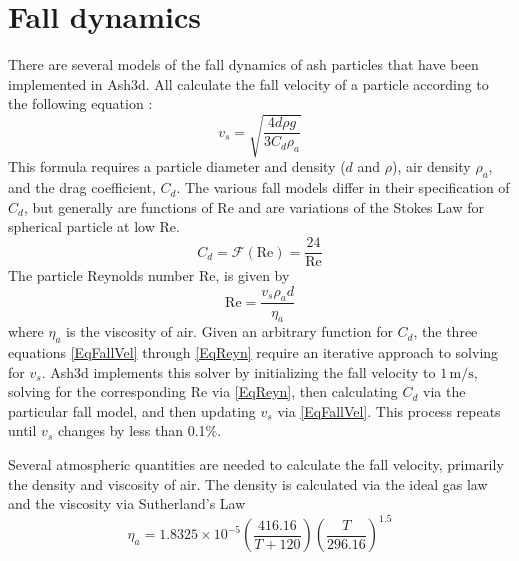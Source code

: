 \chapter{Fall dynamics}\label{ChapAppendFallDynamics}

There are several models of the fall dynamics of ash particles that have
been implemented in Ash3d.  All calculate the fall velocity of a particle
according to the following equation \cite[p.182]{Bird60}:
\begin{equation}
v_s=\sqrt{\frac{4d\rho g}{3C_d\rho_a}}\label{EqFallVel}
\end{equation}
This formula requires a particle diameter and density ($d$ and $\rho$),
air density $\rho_a$, and the drag coefficient, $C_d$.
The various fall models differ in their
specification of $C_d$, but generally are functions of $\mathrm{Re}$
and are variations of the Stokes Law
for spherical particle at low $\mathrm{Re}$.
\begin{equation}
C_d = \mathcal{F}(\mathrm{Re}) = \frac{24}{\mathrm{Re}}\label{EqCdStokes}
\end{equation}
The particle Reynolds number $\mathrm{Re}$, is given by 
\begin{equation}
\mathrm{Re}=\frac{v_s\rho_a d}{\eta_a}\label{EqReyn}
\end{equation}
where $\eta_a$ is the viscosity of air.  Given an arbitrary function
for $C_d$, the three equations \ref{EqFallVel} through \ref{EqReyn}
require an iterative approach to solving for $v_s$.  Ash3d implements
this solver by initializing the fall velocity to $1 \, \mathrm{m/s}$,
solving for the corresponding $\mathrm{Re}$ via \ref{EqReyn}, then
calculating $C_d$ via the particular fall model, and then updating
$v_s$ via \ref {EqFallVel}.  This process repeats until $v_s$ changes
by less than 0.1\%.

Several atmospheric quantities are needed to calculate the fall velocity,
primarily the density and viscosity of air.
The density is calculated via the ideal gas law and the viscosity via
Sutherland's Law \cite[p.102, Eq.4.54]{Jacobson05}
\begin{equation}
\eta_a= 1.8325 \times 10^{-5} \left( \frac{416.16}{T+120}\right) 
\left( \frac{T}{296.16}\right)^{1.5}
\end{equation}


